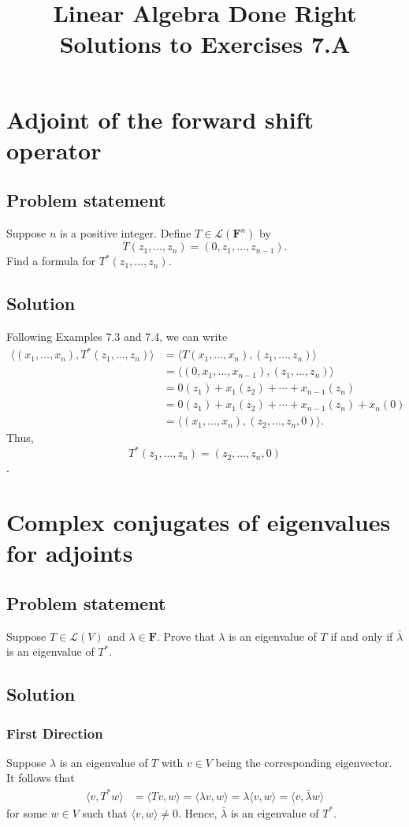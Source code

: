 \documentclass{article}
\title{Linear Algebra Done Right\\Solutions to Exercises 7.A}
\author{}
\date{}
\begin{document}
\maketitle

\section{Adjoint of the forward shift operator}
\subsection*{Problem statement}
Suppose $n$ is a positive integer. Define $T\in\mathcal{L}(\mathbf{F}^{n})$ by
\[T(z_1,\ldots,z_n)=(0,z_1,\ldots,z_{n-1}).\]
Find a formula for $T^*(z_1,\ldots,z_n)$.

\subsection*{Solution}
Following Examples 7.3 and 7.4, we can write
\begin{align*} 
\langle(x_1,\ldots,x_n),T^*(z_1,\ldots,z_n)\rangle &= \langle T(x_1,\ldots,x_n),(z_1,\ldots,z_n)\rangle \\ 
 &= \langle (0,x_1,\ldots,x_{n-1}),(z_1,\ldots,z_n)\rangle \\
 &= 0(z_1) + x_1(z_2) + \cdots + x_{n-1}(z_n) \\
 &= 0(z_1) + x_1(z_2) + \cdots + x_{n-1}(z_n) + x_n(0) \\
 &= \langle (x_1,\ldots,x_n),(z_2,\ldots,z_n,0)\rangle.
\end{align*}
Thus,
\[T^*(z_1,\ldots,z_n)=(z_2,\ldots,z_n,0)\].

\clearpage

\section{Complex conjugates of eigenvalues for adjoints}
\subsection*{Problem statement}
Suppose $T\in\mathcal{L}(V)$ and $\lambda\in\mathbf{F}$. Prove that $\lambda$ is an eigenvalue of $T$ if and only if $\bar{\lambda}$ is an eigenvalue of $T^*$.

\subsection*{Solution}
\subsubsection*{First Direction}
Suppose $\lambda$ is an eigenvalue of $T$ with $v\in V$ being the corresponding eigenvector. It follows that  
\begin{align*}
    \langle v, T^* w\rangle &= \langle Tv, w\rangle = \langle \lambda v, w\rangle = \lambda \langle v, w\rangle = \langle v, \bar{\lambda}w\rangle
\end{align*}
for some $w\in V$ such that $\langle v,w\rangle\neq 0$. Hence, $\bar{\lambda}$ is an eigenvalue of $T^*$.
\end{document}
